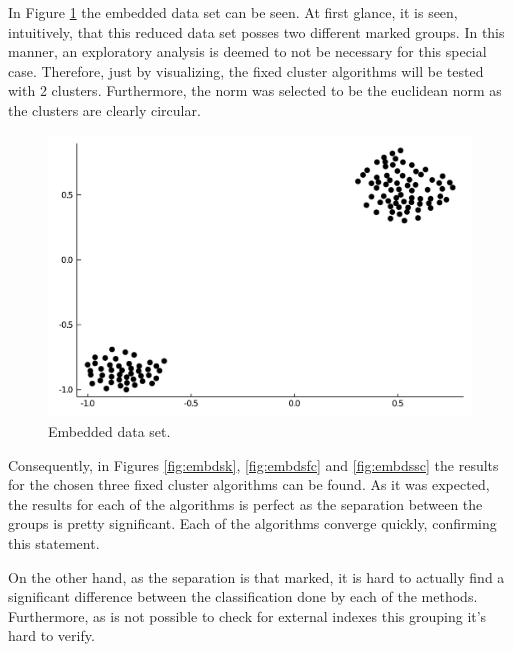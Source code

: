 \documentclass[conference]{IEEEtran}
\theoremstyle{definition}
\theoremstyle{remark}
\theoremstyle{remark}
\begin{document}
In Figure \ref{fig:embds} the embedded data set can be seen. At first glance, it
is seen, intuitively, that this reduced data set posses two different marked
groups. In this manner, an exploratory analysis is deemed to not be necessary
for this special case. Therefore, just by visualizing, the fixed cluster
algorithms will be tested with 2 clusters. Furthermore, the norm was selected to
be the euclidean norm as the clusters are clearly circular.

\begin{figure}[t]
  \centering
  \includegraphics[scale=.3]{figs/real/embedded}
  \caption{Embedded data set.}
  \label{fig:embds}
\end{figure}

Consequently, in Figures \ref{fig:embdsk}, \ref{fig:embdsfc} and
\ref{fig:embdssc} the results for the chosen three fixed cluster algorithms can
be found. As it was expected, the results for each of the algorithms is perfect
as the separation between the groups is pretty significant. Each of the
algorithms converge quickly, confirming this statement.

On the other hand, as the separation is that marked, it is hard to actually find
a significant difference between the classification done by each of the methods.
Furthermore, as is not possible to check for external indexes this grouping it's
hard to verify.
\end{document}
